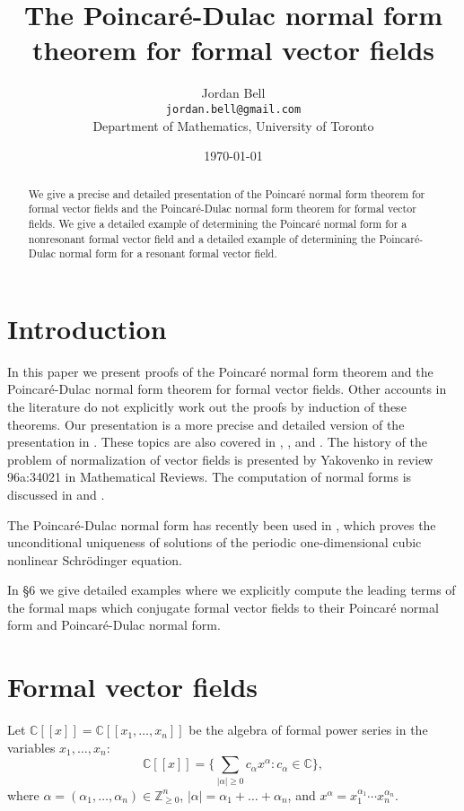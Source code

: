 \documentclass{article}
\begin{document}
\title{The Poincar\'e-Dulac normal form theorem for formal vector fields}
\author{Jordan Bell\\ \texttt{jordan.bell@gmail.com}\\Department of Mathematics, University of Toronto}

\date{\today}       
\maketitle       

\begin{abstract}
We give a precise and detailed presentation of the Poincar\'e normal form theorem for formal vector fields
and the Poincar\'e-Dulac normal form theorem for formal vector fields. We give a detailed example of determining the Poincar\'e normal form for a nonresonant formal vector field and a detailed example
of determining the Poincar\'e-Dulac normal form for a resonant formal vector field.
\end{abstract}


\section{Introduction}
In this paper we present proofs of the Poincar\'e normal form theorem and the Poincar\'e-Dulac normal form theorem for
formal vector fields. Other accounts in the literature do not explicitly work out the proofs by induction of these theorems. 
Our presentation is a more precise and detailed version of the presentation in \cite[\S \S 3--5]{analytic}. These topics are also covered in \cite[\S I.3]{encyclopedia}, \cite[Chapter 5]{arnold1988}, and \cite[\S A.5]{poisson}.
The history of the problem
of normalization of vector fields is presented by Yakovenko in review 96a:34021 in Mathematical Reviews. The computation of normal forms is discussed in \cite{scheurle} and \cite[Chapter 19]{wiggins}.

The Poincar\'e-Dulac normal form has recently been used in \cite{unconditional}, which proves the
unconditional uniqueness of solutions of the periodic one-dimensional cubic nonlinear Schr\"odinger equation.

In \S 6 we give detailed examples where we explicitly compute the leading terms of the formal maps which conjugate formal
vector fields to their Poincar\'e normal form and Poincar\'e-Dulac normal form.

\section{Formal vector fields}
Let $\mathbb{C}[[x]]=\mathbb{C}[[x_1,\ldots,x_n]]$ be the algebra of  formal power series in the variables $x_1,\ldots,x_n$: 
\[
\mathbb{C}[[x]]=\bigg \{\sum_{|\alpha| \geq 0} c_\alpha x^\alpha : c_\alpha \in \mathbb{C} \bigg\},
\]
where $\alpha=(\alpha_1,\ldots,\alpha_n) \in \mathbb{Z}^n_{\geq 0}$, $|\alpha|=\alpha_1 + \ldots +\alpha_n$, and
$x^\alpha=x_1^{\alpha_1} \cdots x_n^{\alpha_n}$.
\end{document}
